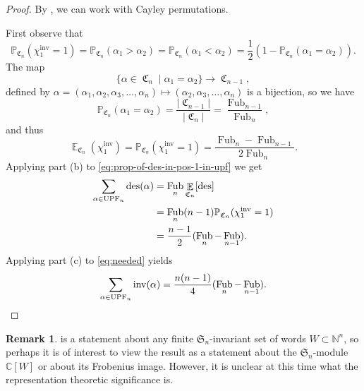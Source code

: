 \documentclass{amsart}
\newcommand{\N}{\mathbb{N}}
\renewcommand{\P}{\mathbb{P}}
\renewcommand{\S}{\mathfrak{S}}
\newcommand{\CC}{\mathbb{C}}
\DeclareMathOperator{\des}{des}
\DeclareMathOperator{\inv}{inv}
\DeclareMathOperator{\UPF}{UPF} %
\DeclareMathOperator{\Fub}{Fub}
\DeclareMathOperator{\E}{\mathbb{E}}
\DeclareMathOperator{\C}{\mathfrak{C}}
\theoremstyle{definition}
\newtheorem{remark}[theorem]{Remark}
\begin{document}
\begin{proof}
By , we can work with Cayley permutations. 

First observe that \[\P_{\C_n}(\chi_1^{\inv}=1)=\P_{\C_n}(\alpha_1>\alpha_2)=\P_{\C_n}(\alpha_1<\alpha_2)=\frac{1}{2}(1-\P_{\C_n}(\alpha_1=\alpha_2)).\]
The map \[\{\alpha\in \C_n\mid\alpha_1=\alpha_2\}\rightarrow \C_{n-1},\]
defined by $\alpha=(\alpha_1,\alpha_2,\alpha_3,\dots,\alpha_n)\mapsto(\alpha_2,\alpha_3,\dots,\alpha_n)$ is a bijection, so we have
\begin{equation}\label{eq:prop-of-tie-in-pos-1-in-upf}
\P_{\C_n}(\alpha_1=\alpha_2)=\frac{|\C_{n-1}|}{|\C_n|}=\frac{\Fub_{n-1}}{\Fub_n},
\end{equation}
and thus
\begin{equation}\label{eq:prop-of-des-in-pos-1-in-upf}
\E_{\C_n}(\chi_1^{\inv})=\P_{\C_n}(\chi_1^{\inv}=1)=\frac{\Fub_n-\Fub_{n-1}}{2\Fub_n}.\end{equation}
Applying   part (b) to \eqref{eq:prop-of-des-in-pos-1-in-upf} we get 
\begin{align}
    \sum_{\alpha\in \UPF_n}\des(\alpha) &=\Fub_n \E_{\C_n}[\des]\notag\\
    &=\Fub_n (n-1) \P_{\C_n}(\chi_1^{\inv}=1)\notag\\
    &=\frac{n-1}{2}(\Fub_n-\Fub_{n-1}).\label{eq:needed}
\end{align}
Applying  part (c) to \eqref{eq:needed} yields
 \[\sum_{\alpha\in \UPF_n}\inv(\alpha)=\frac{n(n-1)}{4}(\Fub_n-\Fub_{n-1}). \qedhere\]
\end{proof}

\begin{remark}
     is a statement about any finite $\S_n$-invariant set of words $W\subset \N^n$, so perhaps  it is of interest to view the result as a statement about the $\S_n$-module $\CC[W]$ or about its Frobenius image. 
    However, it is unclear at this time what the representation theoretic significance is.
\end{remark}
\end{document}
